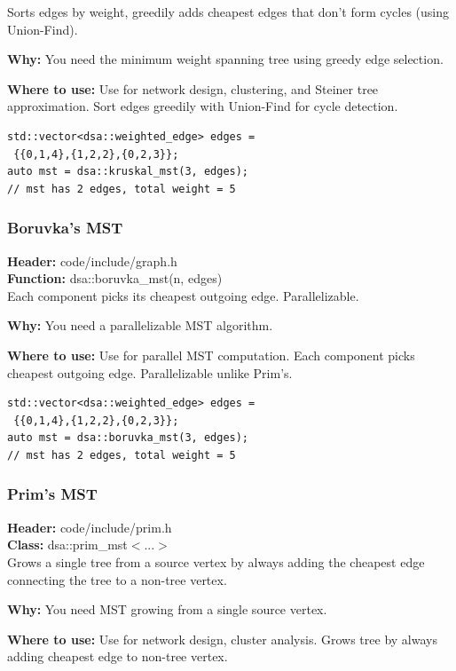 \documentclass[11pt]{article}
\begin{document}
Sorts edges by weight, greedily adds cheapest edges that don't form cycles (using Union-Find).

\textbf{Why:} You need the minimum weight spanning tree using greedy edge selection. \par \textbf{Where to use:} Use for network design, clustering, and Steiner tree approximation. Sort edges greedily with Union-Find for cycle detection.

\begin{lstlisting}
std::vector<dsa::weighted_edge> edges =
 {{0,1,4},{1,2,2},{0,2,3}};
auto mst = dsa::kruskal_mst(3, edges);
// mst has 2 edges, total weight = 5
\end{lstlisting}

\subsubsection{Boruvka's MST}
\textbf{Header:} code/include/graph.h\\
\textbf{Function:} dsa::boruvka\_mst(n, edges)\\

Each component picks its cheapest outgoing edge. Parallelizable.

\textbf{Why:} You need a parallelizable MST algorithm. \par \textbf{Where to use:} Use for parallel MST computation. Each component picks cheapest outgoing edge. Parallelizable unlike Prim's.

\begin{lstlisting}
std::vector<dsa::weighted_edge> edges =
 {{0,1,4},{1,2,2},{0,2,3}};
auto mst = dsa::boruvka_mst(3, edges);
// mst has 2 edges, total weight = 5
\end{lstlisting}

\subsubsection{Prim's MST}
\textbf{Header:} code/include/prim.h\\
\textbf{Class:} dsa::prim\_mst$<$...$>$\\

Grows a single tree from a source vertex by always adding the cheapest edge connecting the tree to a non-tree vertex.

\textbf{Why:} You need MST growing from a single source vertex. \par \textbf{Where to use:} Use for network design, cluster analysis. Grows tree by always adding cheapest edge to non-tree vertex.
\end{document}
